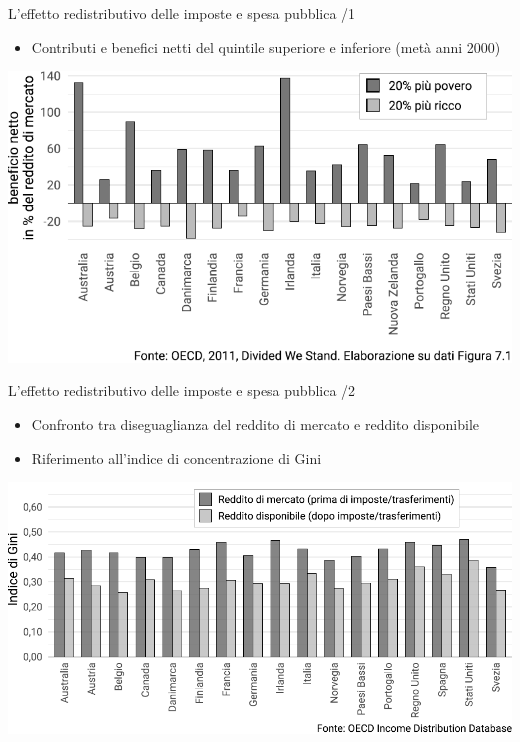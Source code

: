\documentclass[aspectratio=64,11pt]{beamer}
\begin{document}
\begin{frame}{L'effetto redistributivo delle imposte e spesa pubblica /1}
\begin{itemize}
\item Contributi e benefici netti del quintile superiore e inferiore (metà anni 2000)
\end{itemize}

\begin{center}
\includegraphics[width=\textwidth]{./figure/effetti-redistributivi-imposte-benefici.pdf}
\end{center}
\end{frame}

\begin{frame}{L'effetto redistributivo delle imposte e spesa pubblica /2}
\begin{itemize}
\item Confronto tra diseguaglianza del reddito di mercato e reddito disponibile
\item Riferimento all'indice di concentrazione di Gini
\end{itemize}

\begin{center}
\includegraphics[width=\textwidth]{./figure/gini-mkt-disp.pdf}
\end{center}
\end{frame}
\end{document}
